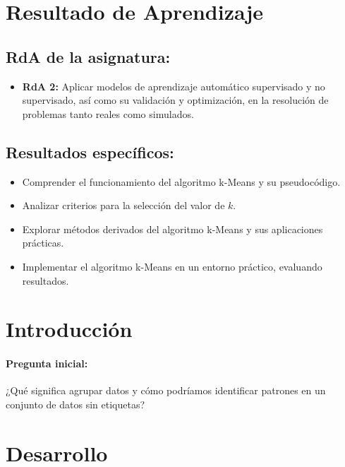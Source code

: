 \documentclass[a4,11pt]{aleph-notas}
\begin{document}
\encabezado


\section*{Resultado de Aprendizaje}

\subsection*{RdA de la asignatura:}
\begin{itemize}[leftmargin=*]
    \item \textbf{RdA 2:} Aplicar modelos de aprendizaje automático supervisado y no supervisado, así como su validación y optimización, en la resolución de problemas tanto reales como simulados.
\end{itemize}

\subsection*{Resultados específicos:}
\begin{itemize}[leftmargin=*]
    \item Comprender el funcionamiento del algoritmo k-Means y su pseudocódigo.
    \item Analizar criterios para la selección del valor de \( k \).
    \item Explorar métodos derivados del algoritmo k-Means y sus aplicaciones prácticas.
    \item Implementar el algoritmo k-Means en un entorno práctico, evaluando resultados.
\end{itemize}

\section*{Introducción}

\paragraph{Pregunta inicial:} 
¿Qué significa agrupar datos y cómo podríamos identificar patrones en un conjunto de datos sin etiquetas?

\section*{Desarrollo}
\end{document}
